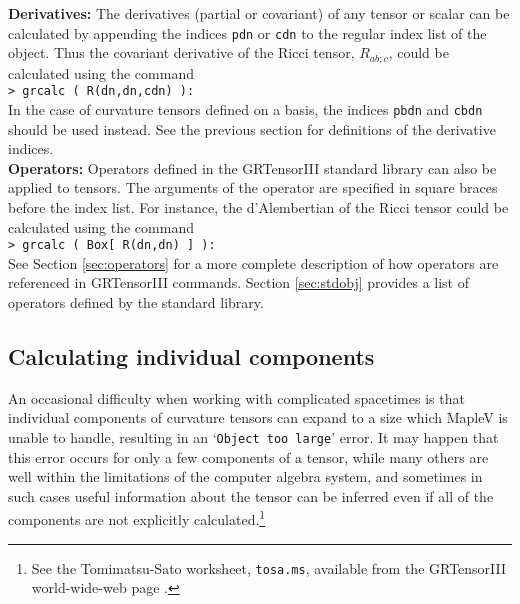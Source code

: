 \documentclass{article}
\begin{document}
\noindent\textbf{Derivatives:} The derivatives (partial or covariant) of
any tensor or scalar can be calculated by appending the indices
\texttt{pdn} or \texttt{cdn} to the regular index list of the object.
Thus the covariant derivative of the Ricci tensor, $R_{ab;c}$,
could be calculated using the command\\

\noindent\texttt{> grcalc ( R(dn,dn,cdn) ):}\\

\noindent In the case of curvature tensors defined on a basis, the indices
\texttt{pbdn} and \texttt{cbdn} should be used instead. See the previous
section for definitions of the derivative indices.\\

\noindent\textbf{Operators:} Operators defined in the GRTensorIII standard
library can also be applied to tensors. The arguments of the operator
are specified in square braces before the index list. For instance, the
d'Alembertian of the Ricci tensor could be calculated using the command\\

\noindent\texttt{> grcalc ( Box[ R(dn,dn) ] ):}\\

\noindent See Section \ref{sec:operators} for a more complete description
of how operators are referenced in GRTensorIII commands. Section
\ref{sec:stdobj} provides a list of operators defined by the standard library.
%
\subsection{Calculating individual components} \label{sec:grcalc1}
%
An occasional difficulty when working with complicated spacetimes is
that individual components of curvature tensors can expand to a size
which MapleV is unable to handle, resulting in an `\texttt{Object too
large}' error.  It may happen that this error occurs for only a few
components of a tensor, while many others are well within the
limitations of the computer algebra system, and sometimes in such
cases useful information about the tensor can be inferred even if all
of the components are not explicitly calculated.\footnote{See the
Tomimatsu-Sato worksheet, \texttt{tosa.ms}, available from the
GRTensorIII world-wide-web page \cite{www}.}
\end{document}
